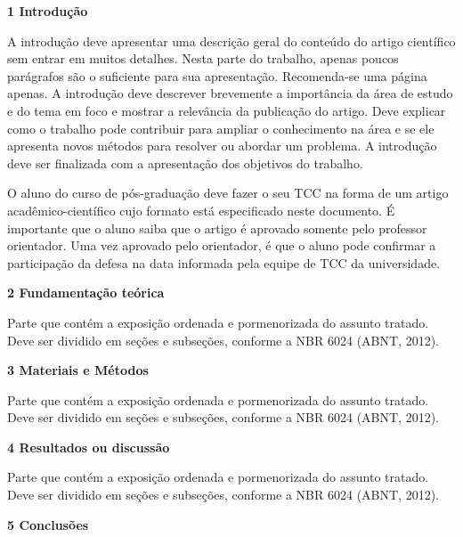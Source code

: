 \documentclass[a4paper, 12pt, oneside] {article}
\begin{document}
\noindent \textbf {1 Introdução}
\singlespacing

\par A introdução deve apresentar uma descrição geral do conteúdo do artigo científico sem entrar em muitos detalhes. Nesta parte do trabalho, apenas poucos parágrafos são o suficiente para sua apresentação. Recomenda-se uma página apenas. A introdução deve descrever brevemente a importância da área de estudo e do tema em foco e mostrar a relevância da publicação do artigo. Deve explicar como o trabalho pode contribuir para ampliar o conhecimento na área e se ele apresenta novos métodos para resolver ou abordar um problema. A introdução deve ser finalizada com a apresentação dos objetivos do trabalho.

    \par O aluno do curso de pós-graduação deve fazer o seu TCC na forma de um artigo acadêmico-científico cujo formato está especificado neste documento. É importante que o aluno saiba que o artigo é aprovado somente pelo professor orientador. Uma vez aprovado pelo orientador, é que o aluno pode confirmar a participação da defesa na data informada pela equipe de TCC da universidade.


\singlespacing


\noindent \textbf{2 Fundamentação teórica}

\par [OBRIGATÓRIO] Parte que contém a exposição ordenada e pormenorizada do assunto tratado. Deve ser dividido em seções e subseções, conforme a NBR 6024 (ABNT, 2012).
\singlespacing

\noindent \textbf{3 Materiais e Métodos}

\par [OBRIGATÓRIO] Parte que contém a exposição ordenada e pormenorizada do assunto tratado. Deve ser dividido em seções e subseções, conforme a NBR 6024 (ABNT, 2012).
\singlespacing

\noindent \textbf{4 Resultados ou discussão}

\par [OBRIGATÓRIO] Parte que contém a exposição ordenada e pormenorizada do assunto tratado. Deve ser dividido em seções e subseções, conforme a NBR 6024 (ABNT, 2012).
\singlespacing

\noindent \textbf{5 Conclusões}
\end{document}
